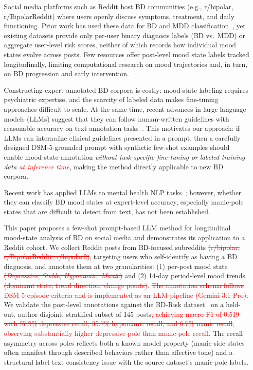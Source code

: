 \documentclass[runningheads]{llncs}
\newcommand{\rev}[1]{\textcolor{red}{#1}}
\newcommand{\del}[1]{\textcolor{red}{\sout{#1}}}
\newcommand{\rev}[1]{#1}
\newcommand{\del}[1]{}
\begin{document}
Social media platforms such as Reddit host BD communities (e.g., r/bipolar, r/BipolarReddit) where users openly discuss symptoms, treatment, and daily functioning. Prior work has used these data for BD and MDD classification~\cite{cohan2018smhd,coppersmith2015clpsych,sekulic2018not}, yet existing datasets provide only per-user binary diagnosis labels (BD vs.~MDD) or aggregate user-level risk scores, neither of which records how individual mood states evolve across posts. Few resources offer post-level mood state labels tracked longitudinally, limiting computational research on mood trajectories and, in turn, on BD progression and early intervention.

Constructing expert-annotated BD corpora is costly: mood-state labeling requires psychiatric expertise, and the scarcity of labeled data makes fine-tuning approaches difficult to scale. At the same time, recent advances in large language models (LLMs) suggest that they can follow human-written guidelines with reasonable accuracy on text annotation tasks~\cite{gilardi2023chatgpt}. This motivates our approach: if LLMs can internalize clinical guidelines presented in a prompt, then a carefully designed DSM-5-grounded prompt with synthetic few-shot examples should enable mood-state annotation \emph{without task-specific fine-tuning or labeled training data \rev{at inference time}}, making the method directly applicable to new BD corpora.

Recent work has applied LLMs to mental health NLP tasks~\cite{xu2024mental,yang2024mentallama}; however, whether they can classify BD mood states at expert-level accuracy, especially manic-pole states that are difficult to detect from text, has not been established.

This paper proposes a few-shot prompt-based LLM method for longitudinal mood-state analysis of BD on social media and demonstrates its application to a Reddit cohort. We collect Reddit posts from BD-focused subreddits\del{ (r/bipolar, r/BipolarReddit, r/bipolar2)}, targeting users who self-identify as having a BD diagnosis, and annotate them at two granularities: (1) per-post mood state\del{ (\emph{Depressive}, \emph{Stable}, \emph{Hypomanic}, \emph{Manic})} and (2) 14-day period-level mood trends\del{ (dominant state, trend direction, change points)}. \del{The annotation schema follows DSM-5 episode criteria and is implemented as an LLM pipeline (Gemini 3.1 Pro).} We validate the post-level annotations against the BD-Risk dataset~\cite{lee2024detecting} on a held-out, author-disjoint, stratified subset of 145 posts\del{, achieving macro F1 of 0.519 with 87.9\% depressive recall, 35.7\% hypomanic recall, and 6.7\% manic recall}\rev{, observing substantially higher depressive-pole than manic-pole recall}. The recall asymmetry across poles reflects both a known model property (manic-side states often manifest through described behaviors rather than affective tone) and a structural label-text consistency issue with the source dataset's manic-pole labels.
\end{document}
